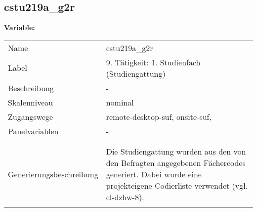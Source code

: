 	
	
	\subsection{cstu219a\_g2r}
	\label{subSection:cstu219a_g2r}

	\noindent\textbf{Variable:}\\
		\begin{tabular}{lL{11.3cm}}
			\label{tableVariable:cstu219a_g2r}
			Name & cstu219a\_g2r \\
			Label & 9. Tätigkeit: 1. Studienfach (Studiengattung) \\
			Beschreibung & - \\
			Skalenniveau & nominal \\
			Zugangswege &
				remote-desktop-suf,
				onsite-suf,
 \\
			Panelvariablen & -
			 \\
			 \\
 \\
					Generierungsbeschreibung & Die Studiengattung wurden aus den von den Befragten angegebenen Fächercodes generiert.  Dabei wurde eine projekteigene Codierliste verwendet (vgl. cl-dzhw-8).
				 \\	
			 \\
		\end{tabular}






